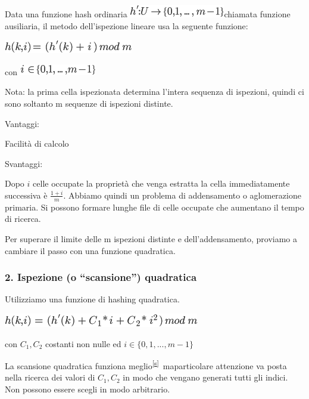 \documentclass{article}
\begin{document}
{{Data una funzione hash ordinaria
}\includegraphics{images/image286.png}{chiamata funzione ausiliaria, il metodo dell'ispezione lineare usa la seguente funzione:}

{}

\includegraphics{images/image287.png}

{con }\includegraphics{images/image288.png}

{}

{Nota: la prima cella ispezionata determina l'intera sequenza di
ispezioni, }{quindi ci sono soltanto m sequenze di ispezioni distinte.}

{Vantaggi}{: }

{Facilità di calcolo}

{Svantaggi}{: }

{Dopo $i$ celle occupate la proprietà che venga estratta la cella immediatamente successiva è $\frac{1+i}{m}$. Abbiamo quindi un problema di addensamento o aglomerazione primaria. Si possono formare lunghe file di celle occupate che aumentano il tempo di ricerca.}

{}

{Per superare il limite delle m ispezioni distinte e dell'addensamento, proviamo a cambiare il passo con una funzione quadratica.}

\hypertarget{h.83xwipol2nwy}{\subsubsection{\texorpdfstring{{2.
Ispezione (o ``scansione'')
quadratica}}{2. Ispezione (o scansione) quadratica}}\label{h.83xwipol2nwy}}

{Utilizziamo una funzione di hashing quadratica.}

\includegraphics{images/image290.png}

{con $C_1,C_2$ costanti non nulle ed $i \in \{0,1,...,m-1\}$}
{}

{La scansione quadratica }{funziona
meglio}\textsuperscript{\protect\hyperlink{cmnt19}{{[}s{]}}}{~maparticolare attenzione va posta nella ricerca dei valori di $C_1,C_2$ in modo che vengano generati tutti gli indici. Non possono essere scegli in modo arbitrario.}

}
\end{document}
